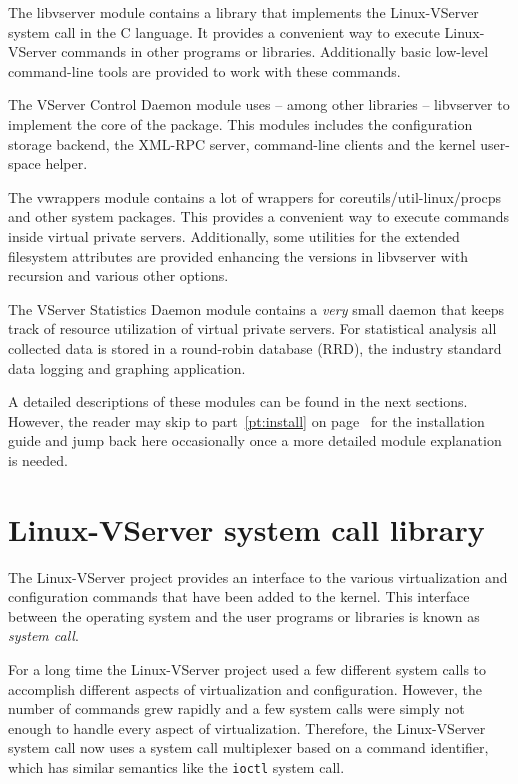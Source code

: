 \begin{labeling}[~~]{}
	 The libvserver module contains a library that
	implements the Linux-VServer system call in the C language. It provides a
	convenient way to execute Linux-VServer commands in other programs or
	libraries.  Additionally basic low-level command-line tools are provided to
	work with these commands.

	 The VServer Control Daemon module uses -- among other
	libraries -- libvserver to implement the core of the package. This modules
	includes the configuration storage backend, the XML-RPC server,
	command-line clients and the kernel user-space helper.

	 The vwrappers module contains a lot of wrappers
	for coreutils/util-linux/procps and other system packages. This provides a
	convenient way to execute commands inside virtual private servers.
	Additionally, some utilities for the extended filesystem attributes are
	provided enhancing the versions in libvserver with recursion and various
	other options.

	 The VServer Statistics Daemon module contains a
	\emph{very} small daemon that keeps track of resource utilization of
	virtual private servers. For statistical analysis all collected data is
	stored in a round-robin database (RRD), the industry standard data logging
	and graphing application.
\end{labeling}

A detailed descriptions of these modules can be found in the next sections.
However, the reader may skip to part~\ref{pt:install} on
page~\pageref{pt:install} for the installation guide and jump back here
occasionally once a more detailed module explanation is needed.


\section{Linux-VServer system call library}
\label{sec:intro:vcd:libvserver}

The Linux-VServer project provides an interface to the various virtualization
and configuration commands that have been added to the kernel. This interface
between the operating system and the user programs or libraries is known as
\emph{system call}.

For a long time the Linux-VServer project used a few different system calls to
accomplish different aspects of virtualization and configuration. However, the
number of commands grew rapidly and a few system calls were simply not enough
to handle every aspect of virtualization. Therefore, the Linux-VServer system
call now uses a system call multiplexer based on a command identifier, which
has similar semantics like the \texttt{ioctl} system call.


